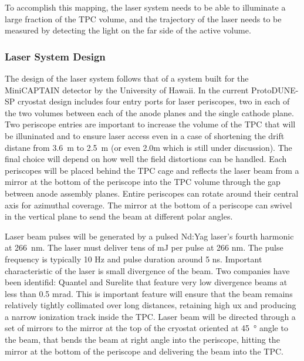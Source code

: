 	To accomplish this mapping, the laser system needs to be able to
illuminate a large fraction of the TPC volume, and the trajectory of the laser
needs to be measured by detecting the light on the far side of the active
volume.

\subsubsection{Laser System Design}

	The design of the laser system follows that of a system built for the
MiniCAPTAIN detector by the University of Hawaii.  In the current ProtoDUNE-SP
cryostat design includes four entry ports for laser periscopes, two in each of
the two volumes between each of the anode planes and the single cathode plane.
Two periscope entries are important to increase the volume of the TPC that will
be illuninated and to ensure laser access even in a case of shortening the
drift distane from 3.6~m to 2.5~m (or even 2.0m which is still under
discussion). The final choice will depend on how well the field distortions can
be handled. Each periscopes will be placed behind the TPC cage and reflects the
laser beam from a mirror at the bottom of the periscope into the TPC volume
through the gap between anode assembly planes. Entire periscopes can rotate
around their central axis for azimuthal coverage. The mirror at the bottom of a
periscope can swivel in the vertical plane to send the beam at different polar
angles.  



Laser beam pulses will be generated by a pulsed Nd:Yag laser's fourth harmonic
at 266~nm. The laser must deliver tens of mJ per pulse at 266 nm. The pulse
frequency is typically 10 Hz and pulse duration around 5 ns. Important
characteristic of the laser is small divergence of the beam. Two companies have
been identifid: Quantel and Surelite that feature very low divergence beams at
less than 0.5 mrad. This is important feature will ensure that the beam remains
relatively tightly collimated over long distances, retaining high ux and
producing a narrow ionization track inside the TPC. Laser beam will be directed
through a set of mirrors to the mirror at the top of the cryostat oriented at
\SI{45}{\degree} angle to the beam, that bends the beam at right angle into the periscope,
hitting the mirror at the bottom of the periscope and delivering the beam into
the TPC.

